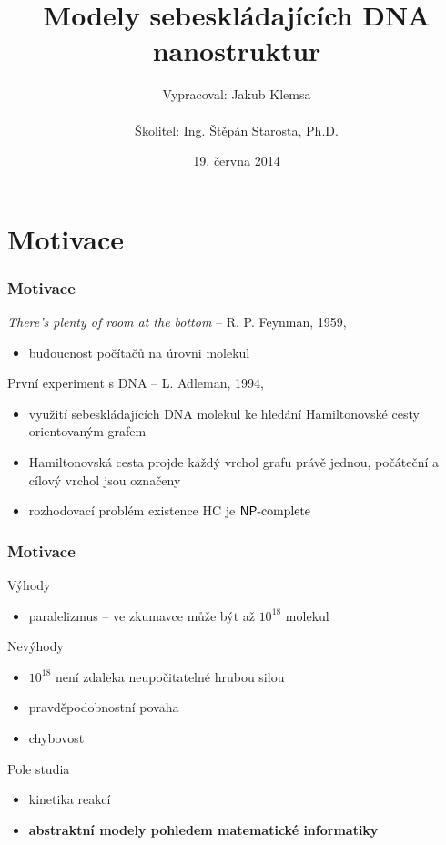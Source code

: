 \documentclass[10pt]{beamer}
\title{Modely sebeskládajících DNA nanostruktur}
\institute
{
	Fakulta jaderná a fyzikálně inženýrská\\
	Matematická informatika
}
\author{Vypracoval: Jakub Klemsa\\
	~\\
	Školitel: Ing. Štěpán Starosta, Ph.D.}
\date{19. června 2014}
\newcommand{\NPC}{\mathsf{NP}\textnormal{-complete}}
\theoremstyle{definition}
\theoremstyle{remark}
\begin{document}
\begin{frame}
	\titlepage
\end{frame}

\begin{frame}
	\tableofcontents
\end{frame}


\section{Motivace}
\begin{frame}
\frametitle{Motivace}
	{\em There's plenty of room at the bottom} -- R. P. Feynman, 1959, \cite{feynman}
	\begin{itemize}
		\item budoucnost počítačů na úrovni molekul
	\end{itemize}
	První experiment s DNA -- L. Adleman, 1994, \cite{adleman94}
	\begin{itemize}
		\item využití sebeskládajících DNA molekul ke hledání Hamiltonovské cesty orientovaným grafem
		\item Hamiltonovská cesta projde každý vrchol grafu právě jednou, počáteční a cílový vrchol jsou označeny
		\item rozhodovací problém existence HC je $\NPC$
	\end{itemize}
\end{frame}

\begin{frame}
\frametitle{Motivace}
	Výhody
	\begin{itemize}
		\item paralelizmus -- ve zkumavce může být až $10^{18}$  molekul
	\end{itemize}
	Nevýhody
	\begin{itemize}
		\item $10^{18}$ není zdaleka neupočitatelné hrubou silou
		\item pravděpodobnostní povaha
		\item chybovost
	\end{itemize}
	Pole studia
	\begin{itemize}
		\item kinetika reakcí
		\item {\bf abstraktní modely pohledem matematické informatiky}
	\end{itemize}
\end{frame}
\end{document}
